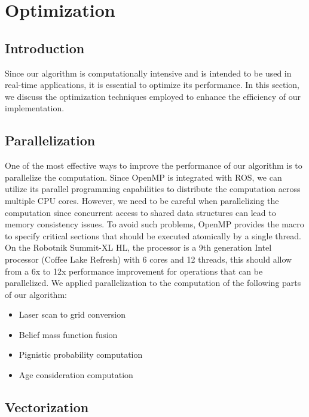 
\section{Optimization}

\subsection{Introduction}

Since our algorithm is computationally intensive and is intended to be used in real-time applications, it is essential to optimize its performance.
In this section, we discuss the optimization techniques employed to enhance the efficiency of our implementation.

\subsection{Parallelization}

One of the most effective ways to improve the performance of our algorithm is to parallelize the computation.
Since OpenMP is integrated with ROS, we can utilize its parallel programming capabilities to distribute the computation across multiple CPU cores.
However, we need to be careful when parallelizing the computation since concurrent access to shared data structures can lead to memory consistency issues.
To avoid such problems, OpenMP provides the \todo macro to specify critical sections that should be executed atomically by a single thread.
On the Robotnik Summit-XL HL, the processor is a 9th generation Intel processor (Coffee Lake Refresh) with 6 cores and 12 threads, this should allow from a 6x to 12x performance improvement for operations that can be parallelized.
We applied parallelization to the computation of the following parts of our algorithm:
\begin{itemize}
    \item Laser scan to grid conversion
    \item Belief mass function fusion
    \item Pignistic probability computation
    \item Age consideration computation
\end{itemize}

\subsection{Vectorization}

